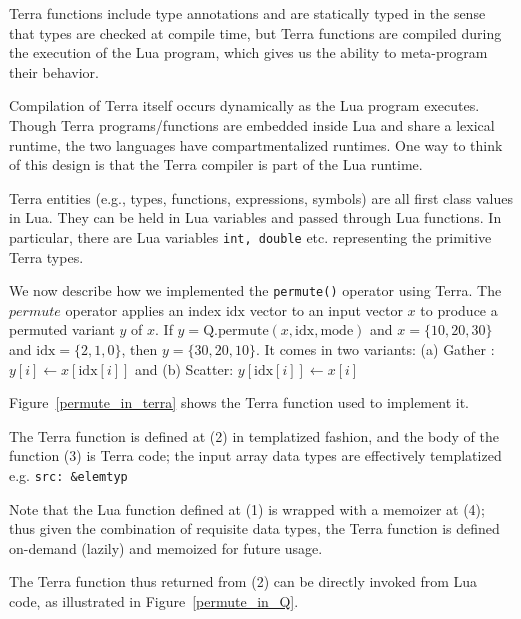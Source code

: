 \item Terra functions include type annotations and are statically typed in the sense that types are checked at compile time, but Terra functions are compiled during the execution of the Lua program, which gives us the ability to meta-program their behavior.

\item Compilation of Terra itself occurs dynamically as the Lua program executes. Though Terra programs/functions are embedded inside Lua and share a lexical runtime, the two languages have compartmentalized runtimes. One way to think of this design is that the Terra compiler
is part of the Lua runtime.

\item Terra entities (e.g., types, functions, expressions, symbols) are all first class values in Lua.
They can be held in Lua variables and passed through Lua functions. In particular, there are Lua variables {\tt int, double} etc. representing the primitive Terra types.

\ee

We now describe how we implemented the {\tt permute()} operator using Terra.
The \(permute\) operator applies an index \(\mathrm{idx}\) vector to an input vector \(x\)
to produce a permuted variant \(y\) of \(x\). 
If \(y = \mathrm{Q.permute}(x, \mathrm{idx}, \mathrm{mode})\) and \(x = \{10, 20, 30\}\) and
\(\mathrm{idx} = \{2, 1,
0\}\), then \(y = \{30, 20, 10\}\).
It comes in two variants:
(a) 
Gather : \(y[i] \leftarrow x[\mathrm{idx}[i]]\) and (b) 
Scatter: \(y[\mathrm{idx}[i]] \leftarrow x[i]\) 

\begin{figure}
\centering
{}
\end{figure}

Figure~\ref{permute_in_terra} shows the Terra function used to implement it.
\bi
\item The Terra function is defined at (2) in templatized fashion, and the body of the function (3) is Terra code; the input array data types are effectively templatized e.g. {\tt src: \&elemtyp}
\item Note that the Lua function defined at (1) is wrapped with a memoizer at (4); thus given the combination of requisite data types, the Terra function is defined on-demand (lazily) and memoized for future usage.
\item The Terra function thus returned from (2) can be directly invoked from Lua code, as illustrated in Figure~\ref{permute_in_Q}.
\ei

